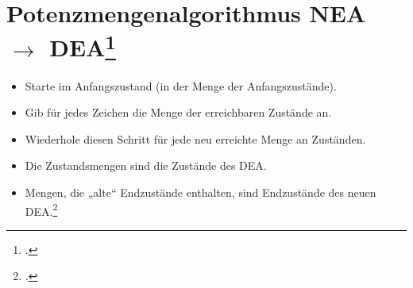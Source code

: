 \documentclass{lehramt-informatik-haupt}
\begin{document}
\section{Potenzmengenalgorithmus NEA $\rightarrow$ DEA\footcite[Seite 35-48]{theo:fs:1}}

\begin{itemize}
\item Starte im Anfangszustand (in der Menge der Anfangszustände).

\item Gib für jedes Zeichen die Menge der erreichbaren Zustände an.

\item Wiederhole diesen Schritt für jede neu erreichte Menge an
Zuständen.

\item Die Zustandsmengen sind die Zustände des DEA.

\item Mengen, die „alte“ Endzustände enthalten, sind Endzustände des
neuen DEA.\footcite{wiki:potenzmengenkonstruktion}
\end{itemize}
\literatur
\end{document}
